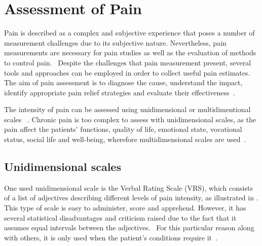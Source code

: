\section{Assessment of Pain}
Pain is described as a complex and subjective experience that poses a number of measurement challenges due to its subjective nature. Nevertheless, pain measurements are necessary for pain studies as well as the evaluation of methods to control pain.~\cite{Jensen2001} %
Despite the challenges that pain measurement present, several tools and approaches can be employed in order to collect useful pain estimates.~\cite{Younger2010} The aim of pain assessment is to diagnose the cause, understand the impact, identify appropriate pain relief strategies and evaluate their effectiveness~\cite{Briggs2010}.


The intensity of pain can be assessed using unidimensional or multidimentional scales ~\cite{Jensen2001}.
Chronic pain is too complex to assess with unidimensional scales, as the pain affect the patients' functions, quality of life, emotional state, vocational status, social life and well-being, wherefore multidimensional scales are used~\cite{Ebert2010}. 


\subsection{Unidimensional scales}
One used unidimensional scale is the Verbal Rating Scale (VRS), which consists of a list of adjectives describing different levels of pain intensity, as illustrated in . This type of scale is easy to administer, score and apprehend. However, it has several statistical disadvantages and criticism raised due to the fact that it assumes equal intervals between the adjectives.~\cite{Jensen2001} For this particular reason along with others, it is only used when the patient's conditions require it~\cite{Jensen1986}. 

